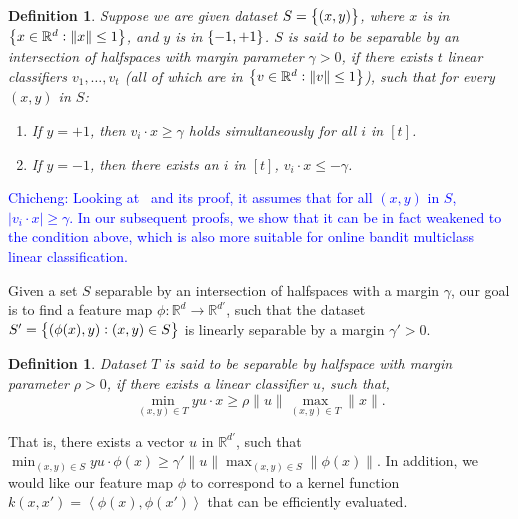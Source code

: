 \documentclass{article}
\newcommand{\field}[1]{\mathbb{#1}}
\newcommand{\fR}{\field{R}}
\newcommand{\inner}[1]{ \left\langle {#1} \right\rangle }
\newcommand{\cz}[1]{\textcolor{blue}{Chicheng: #1}}
\newtheorem{definition}[theorem]{Definition}
\begin{document}
\begin{definition}
Suppose we are given dataset $S = \cbr{(x, y)}$, where $x$ is in $\cbr{x \in \fR^d: \| x \| \leq 1}$, and $y$ is in $\cbr{-1,+1}$.
$S$ is said to be separable by an intersection of halfspaces with margin parameter $\gamma > 0$, if there exists $t$ linear classifiers $v_1, \ldots, v_t$ (all of which are in $\cbr{v \in \fR^d: \| v \| \leq 1}$),
such that for every $(x,y)$ in $S$:
\begin{enumerate}
  \item If $y = +1$, then $v_i \cdot x \geq \gamma$ holds simultaneously for all $i$ in $[t]$.
  \item If $y = -1$, then there exists an $i$ in $[t]$, $v_i \cdot x \leq -\gamma$.
\end{enumerate}
\label{def:int-margin}
\end{definition}
\cz{Looking at~\cite{klivans2004learning} and its proof, it assumes that for all $(x,y)$ in $S$, $|v_i \cdot x| \geq \gamma$. In our subsequent proofs, we show that it can be in fact weakened to the condition above, which is also more suitable for online bandit multiclass linear classification.}

Given a set $S$ separable by an intersection of halfspaces with a margin $\gamma$, our goal is to find a feature map $\phi: \fR^d \to \fR^{d'}$, such that the dataset $S' = \cbr{(\phi(x), y): (x,y) \in S}$ is linearly separable by a margin $\gamma' > 0$.
\begin{definition}
Dataset $T$ is said to be separable by halfspace with margin parameter $\rho > 0$, if there exists a linear classifier $u$, such that,
\[ \min_{(x,y) \in T} y u \cdot x \geq \rho \|u\| \max_{(x,y) \in T} \| x \|. \]
\end{definition}

That is,
there exists a vector $u$ in $\fR^{d'}$, such that $\min_{(x,y) \in S} y u \cdot \phi(x) \geq \gamma' \|u\| \max_{(x,y) \in S} \| \phi(x) \|$.
In addition, we would like our feature map $\phi$ to correspond to a kernel function $k(x,x') = \inner{\phi(x), \phi(x')}$ that can be efficiently evaluated.
\end{document}
